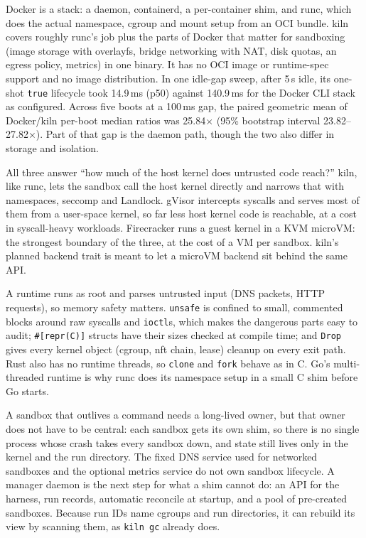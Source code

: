 \documentclass[10pt,letterpaper]{article}
\newcommand{\code}[1]{\texttt{#1}}
\begin{document}

{Docker is a stack: a daemon, containerd, a per-container shim, and runc, which
does the actual namespace, cgroup and mount setup from an OCI bundle. kiln covers
roughly runc's job plus the parts of Docker that matter for sandboxing (image
storage with overlayfs, bridge networking with NAT, disk quotas, an egress
policy, metrics) in one binary. It has no OCI image or runtime-spec support and
no image distribution. In one idle-gap sweep, after 5\,s idle, its one-shot
\code{true} lifecycle took 14.9\,ms (p50) against 140.9\,ms for the Docker CLI
stack as configured. Across five boots at a 100\,ms gap, the paired geometric
mean of Docker/kiln per-boot median ratios was 25.84$\times$ (95\% bootstrap
interval 23.82--27.82$\times$). Part of
that gap is the daemon path, though the two also differ in storage and
isolation.}

{All three answer ``how much of the host kernel does untrusted code reach?''
kiln, like runc, lets the sandbox call the host kernel directly and narrows that
with namespaces, seccomp and Landlock. gVisor intercepts syscalls and serves most
of them from a user-space kernel, so far less host kernel code is reachable, at a
cost in syscall-heavy workloads. Firecracker runs a guest kernel in a KVM microVM:
the strongest boundary of the three, at the cost of a VM per sandbox. kiln's
planned backend trait is meant to let a microVM backend sit behind the same API.}

{A runtime runs as root and parses untrusted input (DNS packets, HTTP requests),
so memory safety matters. \code{unsafe} is confined to small, commented blocks
around raw syscalls and \code{ioctl}s, which makes the dangerous parts easy to
audit; \code{\#[repr(C)]} structs have their sizes checked at compile time; and
\code{Drop} gives every kernel object (cgroup, nft chain, lease) cleanup on every
exit path. Rust also has no runtime threads, so \code{clone} and \code{fork} behave
as in C. Go's multi-threaded runtime is why runc does its namespace setup in a
small C shim before Go starts.}

{A sandbox that outlives a command needs a long-lived owner, but that owner
does not have to be central: each sandbox gets its own shim, so there is no
single process whose crash takes every sandbox down, and state still lives only
in the kernel and the run directory. The fixed DNS service used for networked
sandboxes and the optional metrics service do not own sandbox lifecycle. A
manager daemon is the next step for what a shim
cannot do: an API for the harness, run records, automatic reconcile at
startup, and a pool of pre-created sandboxes. Because run IDs name cgroups and run directories, it can rebuild its
view by scanning them, as \code{kiln gc} already does.}
\end{document}
